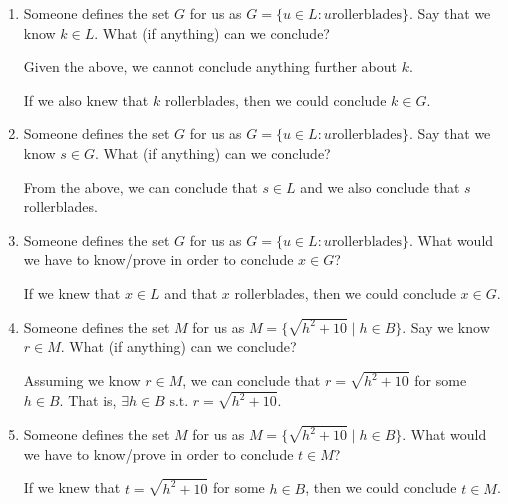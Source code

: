 \documentclass{article}
\begin{document}
\begin{enumerate}

    \item Someone defines the set $G$ for us as $G = \{u \in L : u \text{
                  rollerblades}\}$. Say that we know $k \in L$. What (if anything) can we
          conclude?

          Given the above, we cannot conclude anything further about $k$.

          If we also knew that $k$ rollerblades, then we could conclude $k \in G$.

          \newpage

    \item Someone defines the set $G$ for us as $G = \{u \in L : u \text{
                  rollerblades}\}$. Say that we know $s \in G$. What (if anything) can we
          conclude?

          From the above, we can conclude that $s \in L$ and we also conclude that $s$
          rollerblades.

          \newpage

    \item Someone defines the set $G$ for us as $G = \{u \in L : u \text{
                  rollerblades}\}$. What would we have to know/prove in order to conclude $x \in
              G$?

          If we knew that $x \in L$ and that $x$ rollerblades, then we could conclude $x
              \in G$.

          \newpage

    \item Someone defines the set $M$ for us as $M = \{\sqrt{h^2+10} \mid h \in B\}$. Say
          we know $r \in M$. What (if anything) can we conclude?

          Assuming we know $r \in M$, we can conclude that $r = \sqrt{h^2+10}$ for some
          $h \in B$. That is, $\exists h \in B \text{ s.t. } r = \sqrt{h^2 + 10}$.

          \newpage

    \item Someone defines the set $M$ for us as $M = \{\sqrt{h^2+10} \mid h \in B\}$.
          What would we have to know/prove in order to conclude $t \in M$?

          If we knew that $t = \sqrt{h^2+10}$ for some $h \in B$, then we could conclude
          $t \in M$.

\end{enumerate}
\end{document}
